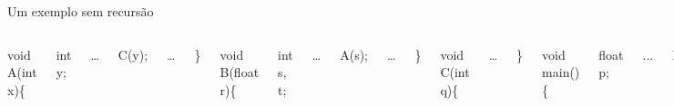 \documentclass[10pt]{beamer}
\begin{document}
\begin{frame}{Um exemplo sem recursão}

\begin{columns}[T,onlytextwidth]
	
    	void A(int x)\{
    
    \hspace{1cm} int y;
        
    \hspace{1cm} …
    
    \hspace{1cm} C(y);
    
    \hspace{1cm} …
    
    \}
	
	void B(float r)\{
    
    \hspace{1cm} int s, t;
        
    \hspace{1cm} …
    
    \hspace{1cm} A(s);
    
    \hspace{1cm} …
    
    \}
    
    void C(int q)\{
    
    \hspace{1cm} …
    
    \}
    
    void main()\{
    
    \hspace{1cm} float p;
    
    \hspace{1cm}...
    
    \hspace{1cm}B(p);
    
    \hspace{1cm}...
    
    \}
    
    /*
    
    \hspace{1cm} main chama B
    
    \hspace{1cm} B chama A
    
    \hspace{1cm} A chama C
    
    */
    
    \end{columns}
    
\end{frame}
\end{document}
